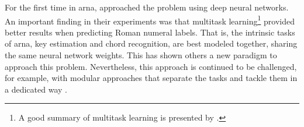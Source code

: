 
For the first time in \gls{arna},
\textcite{chen2018functional} approached the problem using
deep neural networks. An important finding in their
experiments was that multitask learning\footnote{A good
summary of multitask learning is presented by
\textcite{ruder2017overview}.} provided better results when
predicting Roman numeral labels. That is, the intrinsic
tasks of \gls{arna}, key estimation and chord recognition,
are best modeled together, sharing the same neural network
weights. This has shown others a new paradigm to approach
this problem. Nevertheless, this approach is continued to be
challenged, for example, with modular approaches that
separate the tasks and tackle them in a dedicated way
\parencite{mcleod2021modular}.
